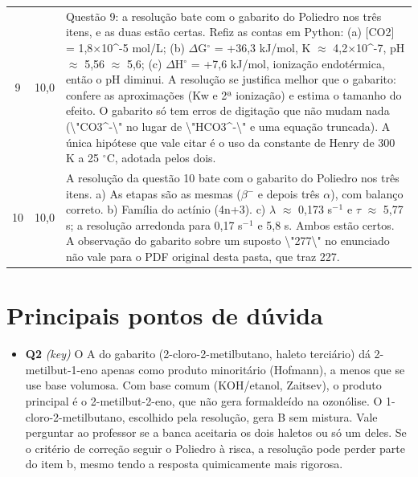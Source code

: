 \documentclass{article}%
\begin{document}
\begin{longtable}{@{}c c p{}@{}}
9 & 10,0 & Questão 9: a resolução bate com o gabarito do Poliedro nos três itens, e as duas estão certas. Refiz as contas em Python: (a) {[}CO2{]} = 1,8$\times$10\^{}{-}5 mol/L; (b) $\Delta$G$^\circ$ = +36,3 kJ/mol, K $\approx$ 4,2$\times$10\^{}{-}7, pH $\approx$ 5,56 $\approx$ 5,6; (c) $\Delta$H$^\circ$ = +7,6 kJ/mol, ionização endotérmica, então o pH diminui. A resolução se justifica melhor que o gabarito: confere as aproximações (Kw e 2ª ionização) e estima o tamanho do efeito. O gabarito só tem erros de digitação que não mudam nada (\textbackslash{}"CO3\^{}{-}\textbackslash{}" no lugar de \textbackslash{}"HCO3\^{}{-}\textbackslash{}" e uma equação truncada). A única hipótese que vale citar é o uso da constante de Henry de 300 K a 25 $^\circ$C, adotada pelos dois. \\
10 & 10,0 & A resolução da questão 10 bate com o gabarito do Poliedro nos três itens. a) As etapas são as mesmas ($\beta$$^{-}$ e depois três $\alpha$), com balanço correto. b) Família do actínio (4n+3). c) $\lambda$ $\approx$ 0,173 s$^{-}$$^{1}$ e $\tau$ $\approx$ 5,77 s; a resolução arredonda para 0,17 s$^{-}$$^{1}$ e 5,8 s. Ambos estão certos. A observação do gabarito sobre um suposto \textbackslash{}"277\textbackslash{}" no enunciado não vale para o PDF original desta pasta, que traz 227. \\
\bottomrule\end{longtable}%
\section*{Principais pontos de dúvida}%
\begin{itemize}%
\item%
\textbf{Q2} \textit{(key)} O A do gabarito (2{-}cloro{-}2{-}metilbutano, haleto terciário) dá 2{-}metilbut{-}1{-}eno apenas como produto minoritário (Hofmann), a menos que se use base volumosa. Com base comum (KOH/etanol, Zaitsev), o produto principal é o 2{-}metilbut{-}2{-}eno, que não gera formaldeído na ozonólise. O 1{-}cloro{-}2{-}metilbutano, escolhido pela resolução, gera B sem mistura. Vale perguntar ao professor se a banca aceitaria os dois haletos ou só um deles. Se o critério de correção seguir o Poliedro à risca, a resolução pode perder parte do item b, mesmo tendo a resposta quimicamente mais rigorosa.%
\end{itemize}%
\end{document}
